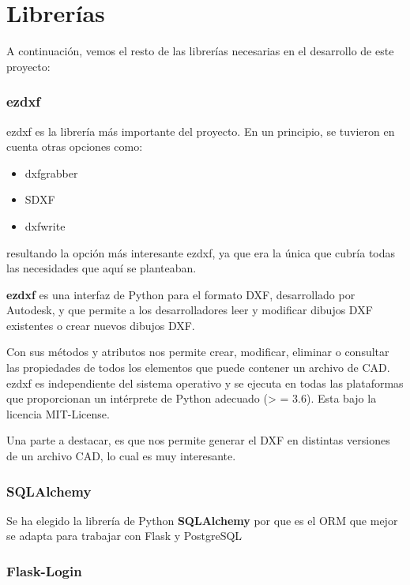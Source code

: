 \section{Librerías}

A continuación, vemos el resto de las librerías necesarias en el desarrollo de este proyecto:


\subsubsection{ezdxf}

ezdxf es la librería más importante del proyecto. En un principio, se tuvieron en cuenta otras opciones como:
\begin{itemize}
\item dxfgrabber
\item SDXF
\item dxfwrite
\end{itemize}

resultando la opción más interesante ezdxf, ya que era la única que cubría todas las necesidades que aquí se planteaban.

\textbf{ezdxf} es una interfaz de Python para el formato DXF, desarrollado por Autodesk, y que permite a los desarrolladores leer y modificar dibujos DXF existentes o crear nuevos dibujos DXF.

Con sus métodos y atributos nos permite crear, modificar, eliminar o consultar las propiedades de todos los elementos que puede contener un archivo de CAD.
ezdxf es independiente del sistema operativo y se ejecuta en todas las plataformas que proporcionan un intérprete de Python adecuado (> = 3.6). Esta bajo la licencia MIT-License.

Una parte a destacar, es que nos permite generar el DXF en distintas versiones de un archivo CAD, lo cual es muy interesante. 


\subsubsection{SQLAlchemy}

Se ha elegido la librería de Python \textbf{SQLAlchemy} por que es el ORM que mejor se adapta para trabajar con Flask y PostgreSQL

\subsubsection{Flask-Login}

